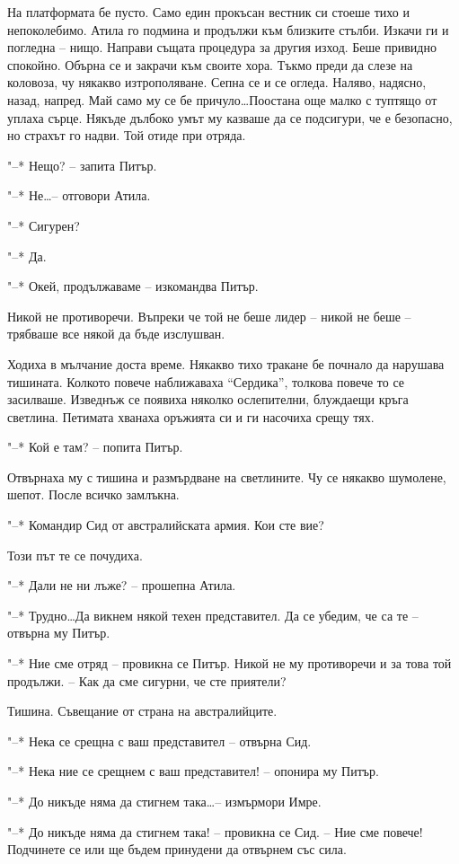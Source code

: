 \documentclass[ebook,openany,12pt]{memoir}
\begin{document}
На платформата бе пусто. Само един прокъсан вестник си стоеше тихо и непоколебимо. Атила го подмина и продължи към близките стълби. Изкачи ги и погледна – нищо. Направи същата процедура за другия изход. Беше привидно спокойно. Обърна се и закрачи към своите хора. Тъкмо преди да слезе на коловоза, чу някакво изтрополяване. Сепна се и се огледа. Наляво, надясно, назад, напред. Май само му се бе причуло\ldots Поостана още малко с туптящо от уплаха сърце. Някъде дълбоко умът му казваше да се подсигури, че е безопасно, но страхът го надви. Той отиде при отряда.

"--* Нещо? – запита Питър.

"--* Не\ldots -- отговори Атила.

"--* Сигурен?

"--* Да.

"--* Окей, продължаваме – изкомандва Питър.

Никой не противоречи. Въпреки че той не беше лидер – никой не беше – трябваше все някой да бъде изслушван.

Ходиха в мълчание доста време. Някакво тихо тракане бе почнало да нарушава тишината. Колкото повече наближаваха ``Сердика'', толкова повече то се засилваше. Изведнъж се появиха няколко ослепителни, блуждаещи кръга светлина. Петимата хванаха оръжията си и ги насочиха срещу тях.

"--* Кой е там? – попита Питър.

Отвърнаха му с тишина и размърдване на светлините. Чу се някакво шумолене, шепот. После всичко замлъкна.

"--* Командир Сид от австралийската армия. Кои сте вие?

Този път те се почудиха.

"--* Дали не ни лъже? – прошепна Атила.

"--* Трудно\ldots Да викнем някой техен представител. Да се убедим, че са те – отвърна му Питър.

"--* Ние сме отряд – провикна се Питър. Никой не му противоречи и за това той продължи. – Как да сме сигурни, че сте приятели? 

Тишина. Съвещание от страна на австралийците.

"--* Нека се срещна с ваш представител – отвърна Сид.

"--* Нека ние се срещнем с ваш представител! – опонира му Питър.

"--* До никъде няма да стигнем така\ldots -- измърмори Имре.

"--* До никъде няма да стигнем така! – провикна се Сид. – Ние сме повече! Подчинете се или ще бъдем принудени да отвърнем със сила.
\end{document}
